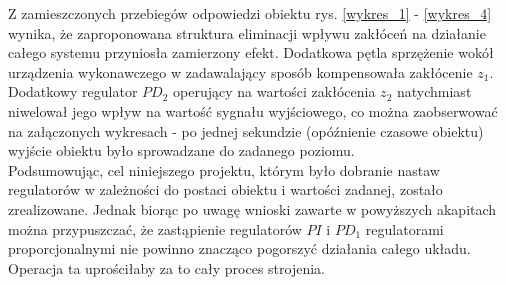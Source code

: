 Z zamieszczonych przebiegów odpowiedzi obiektu rys. \ref{wykres_1} - \ref{wykres_4} wynika, że zaproponowana struktura eliminacji wpływu zakłóceń na działanie całego systemu przyniosła zamierzony efekt. Dodatkowa pętla sprzężenie wokół urządzenia wykonawczego w zadawalający sposób kompensowała zakłócenie $z_1$. Dodatkowy regulator $PD_2$ operujący na wartości zakłócenia $z_2$ natychmiast niwelował jego wpływ na wartość sygnału wyjściowego, co można zaobserwować na załączonych wykresach - po jednej sekundzie (opóźnienie czasowe obiektu) wyjście obiektu było sprowadzane do zadanego poziomu. \\
Podsumowując, cel niniejszego projektu, którym było dobranie nastaw regulatorów w zależności do postaci obiektu i wartości zadanej, zostało zrealizowane.  Jednak biorąc po uwagę wnioski zawarte w powyższych akapitach można przypuszczać, że zastąpienie regulatorów $PI$ i $PD_1$ regulatorami proporcjonalnymi nie powinno znacząco pogorszyć działania całego układu. Operacja ta uprościłaby za to cały proces strojenia.  
